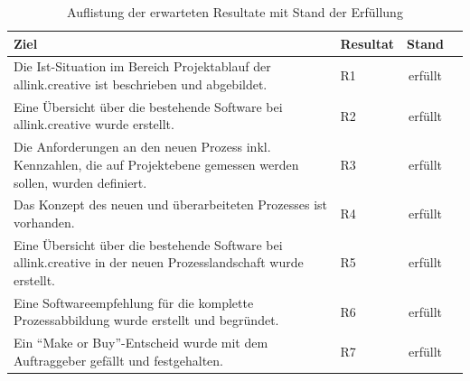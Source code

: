\begin{table}[htbp]
\begin{center}
    \begin{tabular}{p{10cm}lcl}
        \toprule \textbf{Ziel} & \textbf{Resultat} & \textbf{Stand} \\
        \midrule Die Ist-Situation im Bereich Projektablauf der allink.creative
            ist beschrieben und abgebildet. & R1 & erfüllt \\
        \midrule Eine Übersicht über die bestehende Software bei allink.creative
            wurde erstellt. & R2 & erfüllt \\
        \midrule Die Anforderungen an den neuen Prozess inkl. Kennzahlen, die auf 
            Projektebene gemessen werden sollen, wurden definiert. & R3 
            & erfüllt \\
        \midrule Das Konzept des neuen und überarbeiteten Prozesses ist 
            vorhanden. & R4 & erfüllt \\
        \midrule Eine Übersicht über die bestehende Software bei allink.creative
            in der neuen Prozesslandschaft wurde erstellt. & R5 & erfüllt \\
        \midrule Eine Softwareempfehlung für die komplette Prozessabbildung
            wurde erstellt und begründet. & R6 & erfüllt \\
        \midrule Ein ``Make or Buy''-Entscheid wurde mit dem Auftraggeber 
            gefällt und festgehalten. & R7 & erfüllt \\
        \bottomrule
    \end{tabular}
    \caption{Auflistung der erwarteten Resultate mit Stand der Erfüllung}
    \label{tab:erreichte_ziele}
\end{center}
\end{table}
